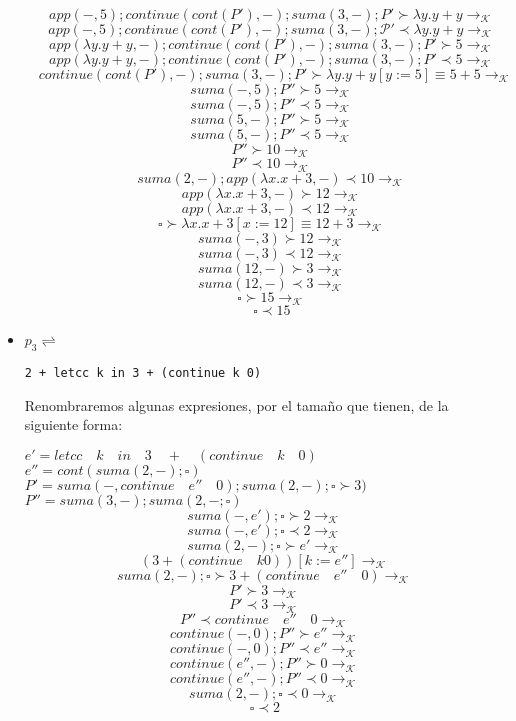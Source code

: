\documentclass[11pt, a4paper]{report}
\begin{document}
\begin{itemize}
$$\quad app(-,5);continue(cont(P'),-);suma(3,-);P' \succ \lambda y.y+y \rightarrow_{\mathcal{K}}$$
$$\quad app(-,5);continue(cont(P'),-);suma(3,-);\mathcal{P}\prime \prec \lambda y.y+y \rightarrow_{\mathcal{K}}$$
$$\quad app(\lambda y.y+y,-);continue(cont(P'),-);suma(3,-);P' \succ 5 \rightarrow_{\mathcal{K}}$$
$$\quad app(\lambda y.y+y,-);continue(cont(P'),-);suma(3,-);P' \prec 5 \rightarrow_{\mathcal{K}}$$
$$\quad continue(cont(P'),-);suma(3,-);P' \succ \lambda y.y+y[y:=5]\equiv 5+5 \rightarrow_{\mathcal{K}}$$
$$\quad suma(-,5);P'' \succ 5 \rightarrow_{\mathcal{K}}$$
$$\quad suma(-,5);P'' \prec 5 \rightarrow_{\mathcal{K}}$$
$$\quad suma(5,-);P'' \succ 5 \rightarrow_{\mathcal{K}}$$
$$\quad suma(5,-);P'' \prec 5 \rightarrow_{\mathcal{K}}$$
$$\quad P'' \succ 10 \rightarrow_{\mathcal{K}}$$
$$\quad P'' \prec 10 \rightarrow_{\mathcal{K}}$$
$$\quad suma(2,-);app(\lambda x.x+3,-)\prec10 \rightarrow_{\mathcal{K}}$$
$$\quad app(\lambda x.x+3,-) \succ 12 \rightarrow_{\mathcal{K}}$$
$$\quad app(\lambda x.x+3,-) \prec 12 \rightarrow_{\mathcal{K}}$$
$$\quad \square \succ \lambda x.x+3[x:=12]\equiv 12+3 \rightarrow_{\mathcal{K}}$$
$$\quad suma(-,3) \succ 12 \rightarrow_{\mathcal{K}}$$
$$\quad suma(-,3) \prec 12 \rightarrow_{\mathcal{K}}$$
$$\quad suma(12,-) \succ 3 \rightarrow_{\mathcal{K}}$$
$$\quad suma(12,-) \prec 3 \rightarrow_{\mathcal{K}}$$
$$\quad \square \succ 15 \rightarrow_{\mathcal{K}}$$
$$\quad \square \prec 15 $$

\item $p_{3} \rightleftharpoons$ 
 \begin{lstlisting}[mathescape=true]
       2 + letcc k in 3 + (continue k 0)
		\end{lstlisting}
		
Renombraremos algunas expresiones, por el tamaño que  tienen, de la siguiente forma:

$e' = letcc \quad k \quad in \quad 3 \quad + \quad (continue \quad k \quad 0)$\\
$e'' = cont(suma(2,-); \square)$\\
$P' = suma(-,continue \quad e'' \quad 0); suma(2,-); \square \succ 3)$\\
$P'' = suma(3,-);suma(2,-; \square)$\\

$$suma(-,e');\square \succ 2 \rightarrow_{\mathcal{K}}$$
$$suma(-,e');\square \prec 2 \rightarrow_{\mathcal{K}}$$
$$suma(2,-);\square \succ e' \rightarrow_{\mathcal{K}}$$
$$(3 + (continue \quad k 0))[k:=e''] \rightarrow_{\mathcal{K}}$$
$$suma(2,-);\square \succ 3 + (continue \quad e'' \quad 0) \rightarrow_{\mathcal{K}}$$
$$P' \succ 3 \rightarrow_{\mathcal{K}}$$
$$P' \prec 3 \rightarrow_{\mathcal{K}}$$
$$P'' \prec continue \quad e'' \quad 0 \rightarrow_{\mathcal{K}}$$
$$continue(-,0);P'' \succ e'' \rightarrow_{\mathcal{K}}$$
$$continue(-,0);P'' \prec e'' \rightarrow_{\mathcal{K}}$$
$$continue(e'',-);P'' \succ 0 \rightarrow_{\mathcal{K}}$$
$$continue(e'',-);P'' \prec 0 \rightarrow_{\mathcal{K}}$$
$$suma(2,-);\square \prec 0 \rightarrow_{\mathcal{K}}$$
$$\square \prec 2$$


\end{itemize}
\end{document}
